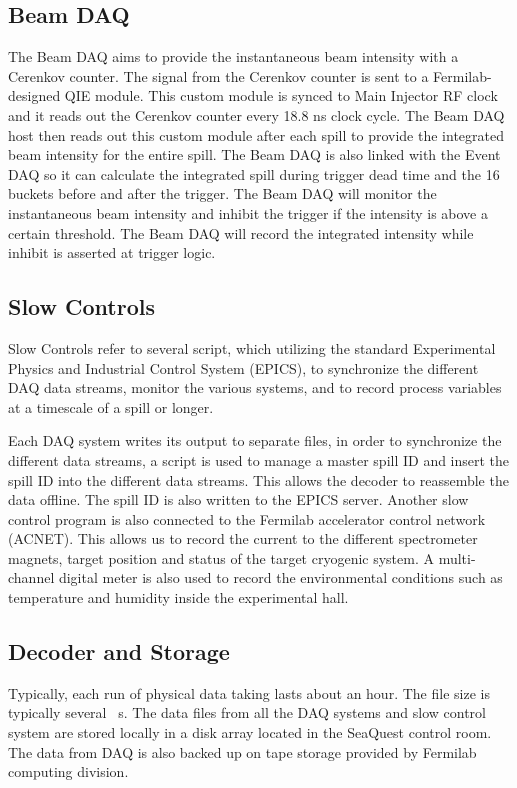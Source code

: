 \documentclass[../main.tex]{subfiles}
\begin{document}
\subsection{Beam DAQ}
The Beam DAQ aims to provide the instantaneous beam intensity with a Cerenkov counter.
The signal from the Cerenkov counter is sent to a Fermilab-designed QIE module.
This custom module is synced to Main Injector RF clock and it reads out the Cerenkov
counter every 18.8 ns clock cycle. The Beam DAQ host then reads out this custom module
after each spill to provide the integrated beam intensity for the entire spill.
The Beam DAQ is also linked with the Event DAQ so it can calculate the integrated spill
during trigger dead time and the 16 buckets before and after the trigger.
The Beam DAQ will monitor the instantaneous beam intensity and inhibit the trigger if the
intensity is above a certain threshold. The Beam DAQ will record the integrated intensity
while inhibit is asserted at trigger logic.


\subsection{Slow Controls}
Slow Controls refer to several script, which utilizing the standard Experimental Physics and Industrial Control
System (EPICS)\cite{dalesio1994}, to synchronize the different DAQ data streams, monitor the various systems,
and to record process variables at a timescale of a spill or longer.

Each DAQ system writes its output to separate files, in order to synchronize the different data streams,
a script is used to manage a master spill ID and insert the spill ID into the different data streams.
This allows the decoder to reassemble the data offline. The spill ID is also written to the EPICS server.
Another slow control program is also connected to the Fermilab accelerator control network (ACNET).
This allows us to record the current to the different spectrometer magnets, target position
and status of the target cryogenic system. A multi-channel digital meter is also used to record
the environmental conditions such as temperature and humidity inside the experimental hall.

\subsection{Decoder and Storage}
Typically, each run of physical data taking lasts about an hour. The file size is typically
several \unit{\giga\byte}s. The data files from all the DAQ systems and slow control system
are stored locally in a disk array located in the SeaQuest control room. The data from DAQ
is also backed up on tape storage provided by Fermilab computing division.
\end{document}
